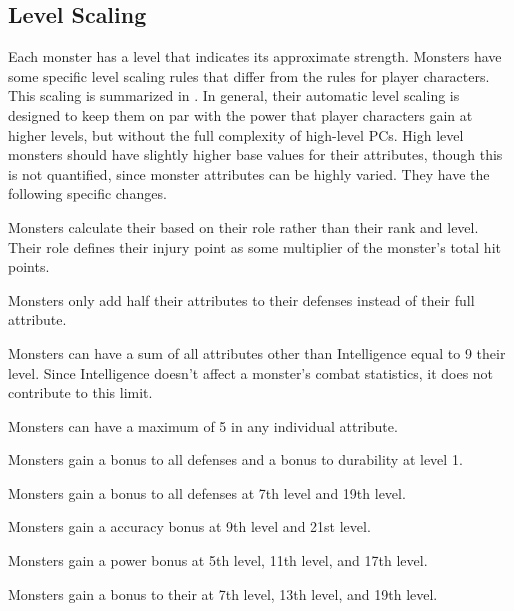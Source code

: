   \subsection{Level Scaling}
    Each monster has a level that indicates its approximate strength.
    Monsters have some specific level scaling rules that differ from the rules for player characters.
    This scaling is summarized in .
    In general, their automatic level scaling is designed to keep them on par with the power that player characters gain at higher levels, but without the full complexity of high-level PCs.
    High level monsters should have slightly higher base values for their attributes, though this is not quantified, since monster attributes can be highly varied.
    They have the following specific changes.
    \begin{raggeditemize}
      \item Monsters calculate their  based on their role rather than their rank and level.
        Their role defines their injury point as some multiplier of the monster's total hit points.
      \item Monsters only add half their attributes to their defenses instead of their full attribute.
      \item Monsters can have a sum of all attributes other than Intelligence equal to 9 \add their level.
        Since Intelligence doesn't affect a monster's combat statistics, it does not contribute to this limit.
      \item Monsters can have a maximum of 5 \add {} in any individual attribute.
      \item Monsters gain a  bonus to all defenses and a  bonus to durability at level 1.
      \item Monsters gain a  bonus to all defenses at 7th level and 19th level.
      \item Monsters gain a  accuracy bonus at 9th level and 21st level.
      \item Monsters gain a  power bonus at 5th level, 11th level, and 17th level.
      \item Monsters gain a  bonus to their  at 7th level, 13th level, and 19th level.
    \end{raggeditemize}

